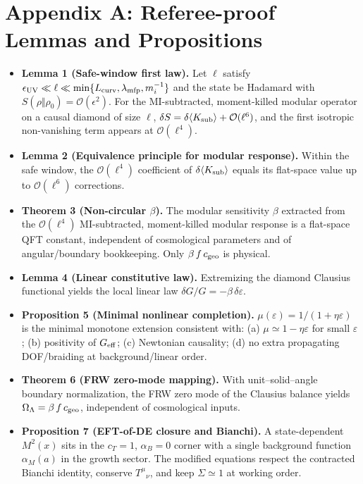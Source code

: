 \documentclass[aps,prd,onecolumn,notitlepage,superscriptaddress,nofootinbib]{revtex4-2}
\newcommand{\OL}{\Omega_{\Lambda}}
\newcommand{\alpham}{\alpha_M}
\newcommand{\eps}{\varepsilon}
\begin{document}
\appendix

\section*{Appendix A: Referee-proof Lemmas and Propositions}
\begin{itemize}[leftmargin=*]
\item \textbf{Lemma 1 (Safe-window first law).} Let \(\ell\) satisfy \(\epsilon_{\rm UV}\ll \ell \ll \min\{L_{\rm curv},\lambda_{\rm mfp},m_i^{-1}\}\) and the state be Hadamard with \(S(\rho\Vert\rho_0)=\mathcal{O}(\epsilon^2)\). For the MI-subtracted, moment-killed modular operator on a causal diamond of size \(\ell\), \(\delta S=\delta\langle K_{\rm sub}\rangle + \mathcal{O}(\ell^6)\), and the first isotropic non-vanishing term appears at \(\mathcal{O}(\ell^4)\).
\item \textbf{Lemma 2 (Equivalence principle for modular response).} Within the safe window, the \(\mathcal{O}(\ell^4)\) coefficient of \(\delta\langle K_{\rm sub}\rangle\) equals its flat-space value up to \(\mathcal{O}(\ell^6)\) corrections.
\item \textbf{Theorem 3 (Non-circular \(\beta\)).} The modular sensitivity \(\beta\) extracted from the \(\mathcal{O}(\ell^4)\) MI-subtracted, moment-killed modular response is a flat-space QFT constant, independent of cosmological parameters and of angular/boundary bookkeeping. Only \(\beta\,f\,c_{\rm geo}\) is physical.
\item \textbf{Lemma 4 (Linear constitutive law).} Extremizing the diamond Clausius functional yields the local linear law \(\delta G/G = -\beta\,\delta\eps\).
\item \textbf{Proposition 5 (Minimal nonlinear completion).} \(\mu(\eps)=1/(1+\eta\eps)\) is the minimal monotone extension consistent with: (a) \(\mu\simeq 1-\eta\eps\) for small \(\eps\); (b) positivity of \(G_{\rm eff}\); (c) Newtonian causality; (d) no extra propagating DOF/braiding at background/linear order.
\item \textbf{Theorem 6 (FRW zero-mode mapping).} With unit–solid–angle boundary normalization, the FRW zero mode of the Clausius balance yields \(\OL=\beta\,f\,c_{\rm geo}\), independent of cosmological inputs.
\item \textbf{Proposition 7 (EFT-of-DE closure and Bianchi).} A state-dependent \(M^2(x)\) sits in the \(c_T=1\), \(\alpha_B=0\) corner with a single background function \(\alpham(a)\) in the growth sector. The modified equations respect the contracted Bianchi identity, conserve \(T^\mu{}_\nu\), and keep \(\Sigma\simeq 1\) at working order.

\end{itemize}
\end{document}
